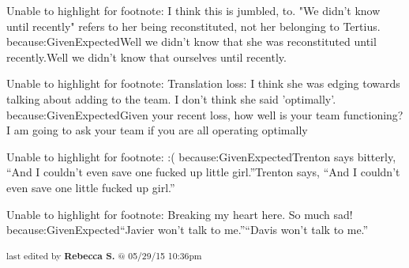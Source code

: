 	Unable to highlight for footnote: I think this is jumbled, to. "We didn't know until recently" refers to her being reconstituted, not her belonging to Tertius. because:GivenExpectedWell we didn’t know that she was reconstituted until recently.Well we didn’t know that ourselves until recently.

	Unable to highlight for footnote: Translation loss: I think she was edging towards talking about adding to the team. I don't think she said 'optimally'. because:GivenExpectedGiven your recent loss, how well is your team functioning?I am going to ask your team if you are all operating optimally

	Unable to highlight for footnote: :( because:GivenExpectedTrenton says bitterly, “And I couldn’t even save one fucked up little girl.”Trenton says, “And I couldn’t even save one little fucked up girl.”

	Unable to highlight for footnote: Breaking my heart here.  So much sad! because:GivenExpected“Javier won’t talk to me.”“Davis won’t talk to me.”


\fi

\vspace{\fill}

\begin{flushright}
\textsubscript{last edited by \textbf{Rebecca S.} @ 05/29/15 10:36pm}
\end{flushright}

